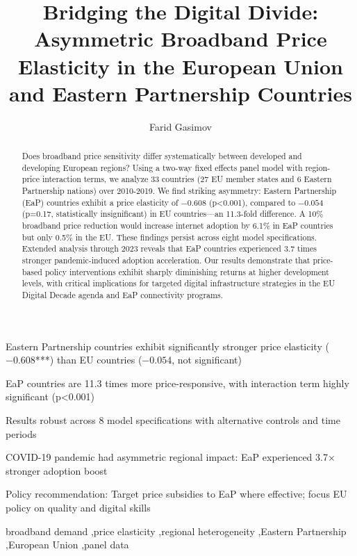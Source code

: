 \documentclass[12pt,review]{elsarticle}
\begin{document}
\begin{frontmatter}

\title{Bridging the Digital Divide: Asymmetric Broadband Price Elasticity in the European Union and Eastern Partnership Countries}

\author[ada]{Farid Gasimov}


\address[ada]{ADA University, Department of Mathematics and Statistics, Ahmadbey Aghaoglu 61, Baku AZ1008, Azerbaijan}

\begin{abstract}
Does broadband price sensitivity differ systematically between developed and developing European regions? Using a two-way fixed effects panel model with region-price interaction terms, we analyze 33 countries (27 EU member states and 6 Eastern Partnership nations) over 2010-2019. We find striking asymmetry: Eastern Partnership (EaP) countries exhibit a price elasticity of $-0.608$ (p<0.001), compared to $-0.054$ (p=0.17, statistically insignificant) in EU countries—an 11.3-fold difference. A 10\% broadband price reduction would increase internet adoption by 6.1\% in EaP countries but only 0.5\% in the EU. These findings persist across eight model specifications. Extended analysis through 2023 reveals that EaP countries experienced 3.7 times stronger pandemic-induced adoption acceleration. Our results demonstrate that price-based policy interventions exhibit sharply diminishing returns at higher development levels, with critical implications for targeted digital infrastructure strategies in the EU Digital Decade agenda and EaP connectivity programs.
\end{abstract}

\begin{highlights}
\item Eastern Partnership countries exhibit significantly stronger price elasticity ($-0.608$***) than EU countries ($-0.054$, not significant)
\item EaP countries are 11.3 times more price-responsive, with interaction term highly significant (p<0.001)
\item Results robust across 8 model specifications with alternative controls and time periods
\item COVID-19 pandemic had asymmetric regional impact: EaP experienced 3.7$\times$ stronger adoption boost
\item Policy recommendation: Target price subsidies to EaP where effective; focus EU policy on quality and digital skills
\end{highlights}

\begin{keyword}
broadband demand \sep price elasticity \sep regional heterogeneity \sep Eastern Partnership \sep European Union \sep panel data
\end{keyword}

\end{frontmatter}
\end{document}
